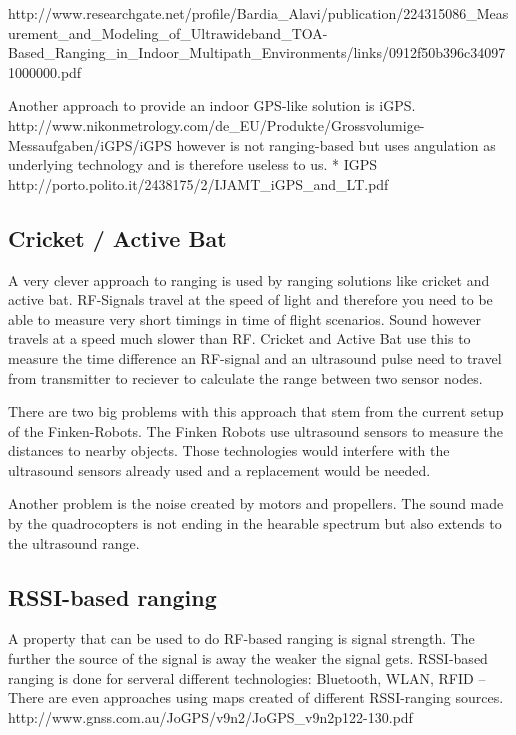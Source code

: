 http://www.researchgate.net/profile/Bardia\_Alavi/publication/224315086\_Measurement\_and\_Modeling\_of\_Ultrawideband\_TOA-Based\_Ranging\_in\_Indoor\_Multipath\_Environments/links/0912f50b396c340971000000.pdf 

Another approach to provide an indoor GPS-like solution is iGPS. http://www.nikonmetrology.com/de\_EU/Produkte/Grossvolumige-Messaufgaben/iGPS/iGPS  however is not ranging-based but uses angulation as underlying technology and is therefore useless to us.
  * IGPS http://porto.polito.it/2438175/2/IJAMT\_iGPS\_and\_LT.pdf

\subsection{Cricket / Active Bat}
A very clever approach to ranging is used by ranging solutions like cricket and active bat. 
RF-Signals travel at the speed of light and therefore you need to be able to measure very short timings in time of flight scenarios.
Sound however travels at a speed much slower than RF.
Cricket and Active Bat use this to measure the time difference an RF-signal and an ultrasound pulse need to travel from transmitter to reciever to calculate the range between two sensor nodes. 



There are two big problems with this approach that stem from the current setup of the Finken-Robots.
The Finken Robots use ultrasound sensors to measure the distances to nearby objects.
Those technologies would interfere with the ultrasound sensors already used and a replacement would be needed.

Another problem is the noise created by motors and propellers.
The sound made by the quadrocopters is not ending in the hearable spectrum but also extends to the ultrasound range.

\subsection{RSSI-based ranging}

A property that can be used to do RF-based ranging is signal strength.
The further the source of the signal is away the weaker the signal gets.
RSSI-based ranging is done for serveral different technologies: Bluetooth, WLAN, RFID –
There are even approaches using maps created of different RSSI-ranging sources. http://www.gnss.com.au/JoGPS/v9n2/JoGPS\_v9n2p122-130.pdf 

